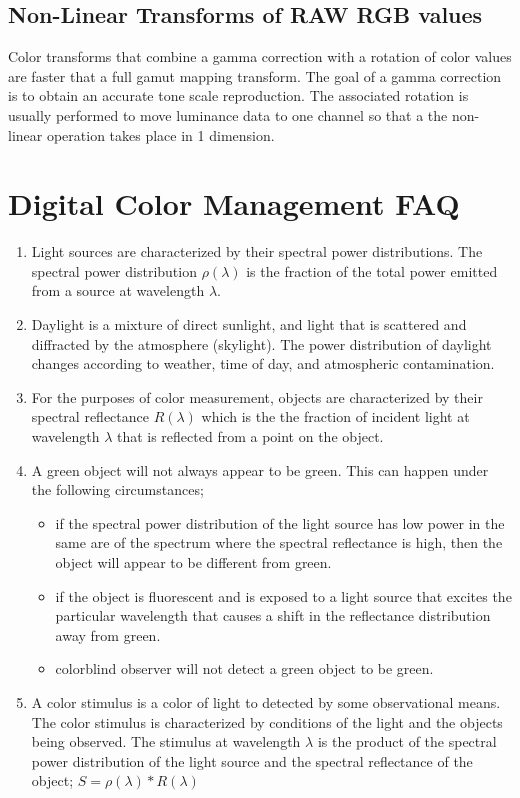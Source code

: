 \subsection{Non-Linear Transforms of RAW RGB values}
Color transforms that combine a gamma correction with a rotation of color values are faster that a full gamut mapping transform. The goal of a gamma correction is to obtain an accurate tone scale reproduction.  The associated rotation is usually performed to move luminance data to one channel so that a the non-linear operation takes place in 1 dimension.


\section{Digital Color Management FAQ}
 \begin{enumerate}
 \item
 Light sources are characterized by their spectral power distributions.  The spectral power distribution $\rho(\lambda)$ is the fraction of the total power emitted from a source at wavelength $\lambda$.
 \item
 Daylight is a mixture of direct sunlight, and light that is scattered and diffracted by the atmosphere (skylight).  The power distribution of daylight changes according to weather, time of day, and atmospheric contamination.
 \item
 For the purposes of color measurement, objects are characterized by their spectral reflectance $R(\lambda)$ which is the the fraction of incident light at wavelength $\lambda$ that is reflected from a point on the object.
 \item
 A green object will not always appear to be green.  This can happen under the following circumstances; \begin{itemize}
 \item
 if the spectral power distribution of the light source has low power in the same are of the spectrum where the spectral reflectance is high, then the object will appear to be different from green.
 \item
 if the object is fluorescent and is exposed to a light source that excites the particular wavelength that causes a shift in the reflectance distribution away from green.
 \item
 colorblind observer will not detect a green object to be green.\end{itemize}
 \item
 A color stimulus is a color of light to detected by some observational means.  The color stimulus is characterized by conditions of the light and the objects being observed.  The stimulus at wavelength $\lambda$ is the product of the spectral power distribution of the light source and the spectral reflectance of the object; $S=\rho(\lambda)*R(\lambda)$

\end{enumerate}
